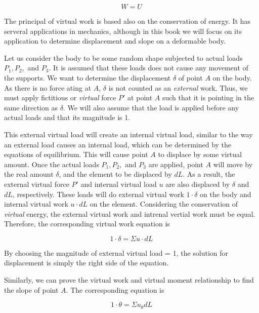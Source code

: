 \documentclass[
fontsize=10pt,
a4paper,
twosides=false,
open=any,
svgnames,
]{kaobook} %
\begin{document}
\begin{equation}
  W = U
\end{equation}

The principal of virtual work is based also on the conservation of energy. It has serveral applications in mechanics, although in this book we will focus on its application to determine displacement and slope on a deformable body.

Let us consider the body to be some random shape subjected to actual loads $P_1, P_2,$ and $P_3$. It is assumed that these loads does not cause any movement of the supports. We want to determine the displacement $\delta$ of point $A$ on the body. As there is no force ating at $A$, $\delta$ is not counted as an \emph{external} work. Thus, we must apply fictitious or \emph{virtual} force $P'$ at point $A$ such that it is pointing in the same direction as $\delta$. We will also assume that the load is applied before any actual loads and that its magnitude is 1.

This external virtual load will create an internal virtual load, similar to the way an external load causes an internal load, which can be determined by the equations of equilibrium. This will cause point $A$ to displace by some virtual amount. Once the actual loads $P_1, P_2,$ and $P_3$ are applied, point $A$ will move by the real amount $\delta$, and the element to be displaced by $dL$. As a result, the external virtual force $P'$ and internal virtual load $u$ are also displaced by $\delta$ and $dL$, respectively. These loads will do external virtual work $1 \cdot \delta$ on the body and internal virtual work $u \cdot dL$ on the element. Considering the conservation of \emph{virtual} energy, the external virtual work and intrenal vertial work must be equal. Therefore, the corresponding virtual work equation is

\begin{equation}
  1 \cdot \delta = \Sigma u \cdot dL
\end{equation}

By choosing the magnitude of external virtual load = 1, the solution for displacement is simply the right side of the equation.

Similarly, we can prove the virtual work and virtual moment relationship to find the slope of point $A$. The corresponding equation is

\begin{equation}
  1 \cdot \theta = \Sigma u_\theta dL
\end{equation}
\end{document}
